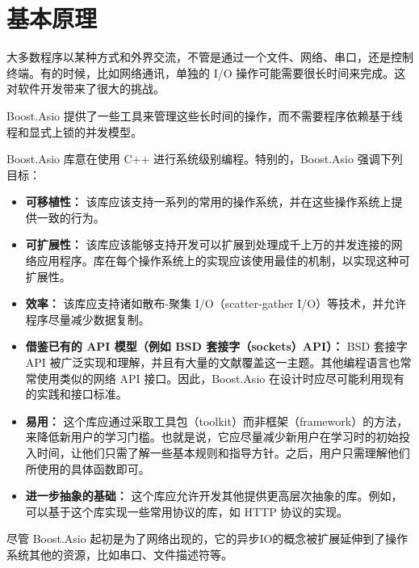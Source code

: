 \section{基本原理}
\par
大多数程序以某种方式和外界交流，不管是通过一个文件、网络、串口，还是控制终端。有的时候，比如网络通讯，单独的 I/O 操作可能需要很长时间来完成。这对软件开发带来了很大的挑战。

\par
Boost.Asio 提供了一些工具来管理这些长时间的操作，而不需要程序依赖基于线程和显式上锁的并发模型。

\par
Boost.Asio 库意在使用 C++ 进行系统级别编程。特别的，Boost.Asio 强调下列目标：

\begin{itemize}
	\item \textbf{可移植性：} 该库应该支持一系列的常用的操作系统，并在这些操作系统上提供一致的行为。
	\item \textbf{可扩展性：} 该库应该能够支持开发可以扩展到处理成千上万的并发连接的网络应用程序。库在每个操作系统上的实现应该使用最佳的机制，以实现这种可扩展性。
	\item \textbf{效率：} 该库应支持诸如散布-聚集 I/O（scatter-gather I/O）等技术，并允许程序尽量减少数据复制。
	\item \textbf{借鉴已有的 API 模型（例如 BSD 套接字（sockets）API）：} BSD 套接字 API 被广泛实现和理解，并且有大量的文献覆盖这一主题。其他编程语言也常常使用类似的网络 API 接口。因此，Boost.Asio 在设计时应尽可能利用现有的实践和接口标准。
	\item \textbf{易用：} 这个库应通过采取工具包（toolkit）而非框架（framework）的方法，来降低新用户的学习门槛。也就是说，它应尽量减少新用户在学习时的初始投入时间，让他们只需了解一些基本规则和指导方针。之后，用户只需理解他们所使用的具体函数即可。
	\item \textbf{进一步抽象的基础：} 这个库应允许开发其他提供更高层次抽象的库。例如，可以基于这个库实现一些常用协议的库，如 HTTP 协议的实现。
\end{itemize}
尽管 Boost.Asio 起初是为了网络出现的，它的异步IO的概念被扩展延伸到了操作系统其他的资源，比如串口、文件描述符等。
